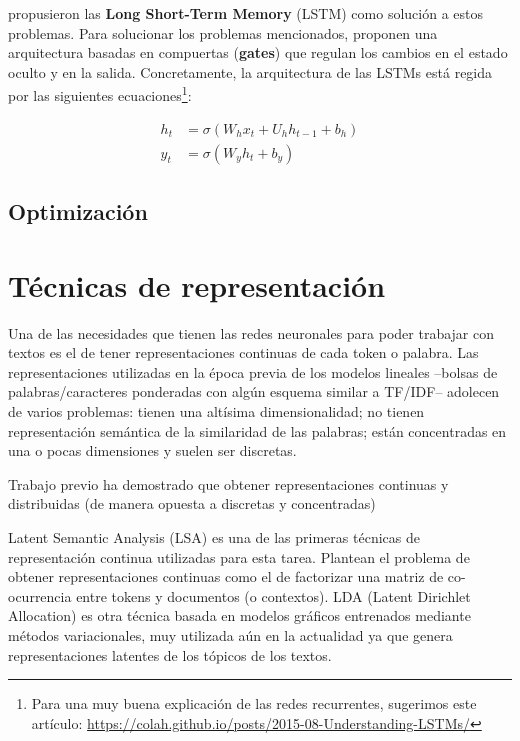\citet{hochreiter1997long} propusieron las \textbf{Long Short-Term Memory} (LSTM) como solución a estos problemas. Para solucionar los problemas mencionados, proponen una arquitectura basadas en compuertas (\textbf{gates}) que regulan los cambios en el estado oculto y en la salida. Concretamente, la arquitectura de las LSTMs está regida por las siguientes ecuaciones\footnote{Para una muy buena explicación de las redes recurrentes, sugerimos este artículo: \url{https://colah.github.io/posts/2015-08-Understanding-LSTMs/}}:


\begin{align}
    h_t &= \sigma(W_h x_t + U_h h_{t-1} + b_h) \\
    y_t &= \sigma(W_y h_t + b_y)
    \label{eq:lstm}
\end{align}



\subsection{Optimización}


\section{Técnicas de representación}

Una de las necesidades que tienen las redes neuronales para poder trabajar con textos es el de tener representaciones continuas de cada token o palabra. Las representaciones utilizadas en la época previa de los modelos lineales --bolsas de palabras/caracteres ponderadas con algún esquema similar a TF/IDF-- adolecen de varios problemas: tienen una altísima dimensionalidad; no tienen representación semántica de la similaridad de las palabras; están concentradas en una o pocas dimensiones y suelen ser discretas.

Trabajo previo ha demostrado que obtener representaciones continuas y distribuidas (de manera opuesta a discretas y concentradas)

Latent Semantic Analysis (LSA) \cite{landauer1997solution} es una de las primeras técnicas de representación continua utilizadas para esta tarea. Plantean el problema de obtener representaciones continuas como el de factorizar una matriz de co-ocurrencia entre tokens y documentos (o contextos). LDA (Latent Dirichlet Allocation) \cite{blei2003latent} es otra técnica basada en modelos gráficos entrenados mediante métodos variacionales, muy utilizada aún en la actualidad ya que genera representaciones latentes de los tópicos de los textos.


